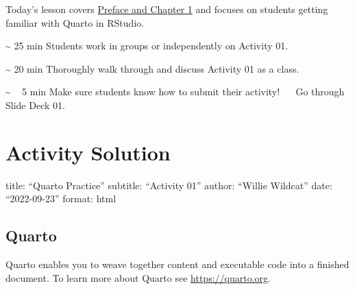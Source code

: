 \documentclass[
  letterpaper,
  DIV=11,
  numbers=noendperiod]{scrreprt}
\begin{document}
Today's lesson covers
\href{https://nustat.github.io/intro-stat-data-sci/}{Preface and Chapter
1} and focuses on students getting familiar with Quarto in RStudio.

\begin{tcolorbox}[enhanced jigsaw, colframe=quarto-callout-note-color-frame, breakable, colback=white, toprule=.15mm, leftrule=.75mm, title={Agenda}, left=2mm, coltitle=black, bottomtitle=1mm, bottomrule=.15mm, rightrule=.15mm, colbacktitle=quarto-callout-note-color!10!white, opacitybacktitle=0.6, opacityback=0, toptitle=1mm, arc=.35mm, titlerule=0mm]
\textasciitilde{} 25 min Students work in groups or independently on
Activity 01.

\textasciitilde{} 20 min Thoroughly walk through and discuss Activity 01
as a class.

\textasciitilde{} ~ 5 min Make sure students know how to submit their
activity! ~~ Go through Slide Deck 01.
\end{tcolorbox}

\hypertarget{activity-solution}{%
\section*{Activity Solution}\label{activity-solution}}

\begin{tcolorbox}[enhanced jigsaw, colframe=quarto-callout-important-color-frame, breakable, colback=white, toprule=.15mm, leftrule=.75mm, title={Task 2}, left=2mm, coltitle=black, bottomtitle=1mm, bottomrule=.15mm, rightrule=.15mm, colbacktitle=quarto-callout-important-color!10!white, opacitybacktitle=0.6, opacityback=0, toptitle=1mm, arc=.35mm, titlerule=0mm]
title: ``Quarto Practice'' subtitle: ``Activity 01'' author: ``Willie
Wildcat'' date: ``2022-09-23'' format: html
\end{tcolorbox}

\hypertarget{quarto}{%
\subsection*{Quarto}\label{quarto}}

Quarto enables you to weave together content and executable code into a
finished document. To learn more about Quarto see
\url{https://quarto.org}.
\end{document}
